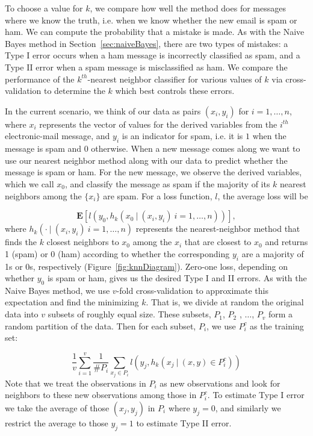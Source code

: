 To choose a value for $k$, we compare how well the method does for
messages where we know the truth, i.e. when we know whether the new
email is spam or ham.  We can compute the probability that a mistake
is made.  As with the Naive Bayes method in
Section~\ref{sec:naiveBayes}, there are two types of mistakes: a Type
I error occurs when a ham message is incorrectly classified as spam,
and a Type II error when a spam message is misclassified as ham.  We
compare the performance of the $k^{th}$-nearest neighbor classifier
for various values of $k$ via cross-validation to determine the $k$
which best controls these errors.

In the current scenario, we think of our data as pairs $(x_i, y_i)$
for $i= 1, \ldots , n$, where $x_i$ represents the vector of values
for the derived variables from the $i^{th}$ electronic-mail message,
and $y_i$ is an indicator for spam, i.e. it is $1$ when the message is
spam and 0 otherwise.  When a new message comes along we want to use
our nearest neighbor method along with our data to predict whether the
message is spam or ham.  For the new message, we observe the derived
variables, which we call $x_0$, and classify the message as spam if
the majority of its $k$ nearest neighbors among the $\{x_i\}$ are
spam.  For a loss function, ${l}$, the average loss will be

$$  \textbf{E} [ {l}(y_0 , h_k(x_0 ~| ~(x_i , y_i)~ i=1, \ldots , n) )],$$
where $h_k( \cdot ~| ~(x_i , y_i)~ i=1, \ldots , n)$ represents the
nearest-neighbor method that finds the $k$ closest neighbors to $x_0$
among the $x_i$ that are closest to $x_0$ and returns 1 (spam) or 0
(ham) according to whether the corresponding $y_i$ are a majority of
1s or 0s, respectively (Figure~\ref{fig:knnDiagram}).  Zero-one loss,
depending on whether $y_0$ is spam or ham, gives us the desired Type I
and II errors.  As with the Naive Bayes method, we use $v$-fold
cross-validation to approximate this expectation and find the
minimizing $k$.  That is, we divide at random the original data into
$v$ subsets of roughly equal size.  These subsets, $P_1$, $P_2$ ,
$\ldots$, $P_v$ form a random partition of the data.  Then for each
subset, $P_i$, we use $P_i^c$ as the training set:

$$ \frac {1}{v} \sum_{i=1}^v \frac {1} {\#P_i} \sum_{x_j \in P_i} {l}(y_j , h_k(x_j ~|~(x,y) \in P_i^c )) $$
Note that we treat the observations in $P_i$ as new observations and
look for neighbors to these new observations among those in $P_i^c$.
To estimate Type I error we take the average of those $(x_j , y_j)$ in
$P_i$ where $y_j = 0$, and similarly we restrict the average to those
$y_j = 1$ to estimate Type II error.

